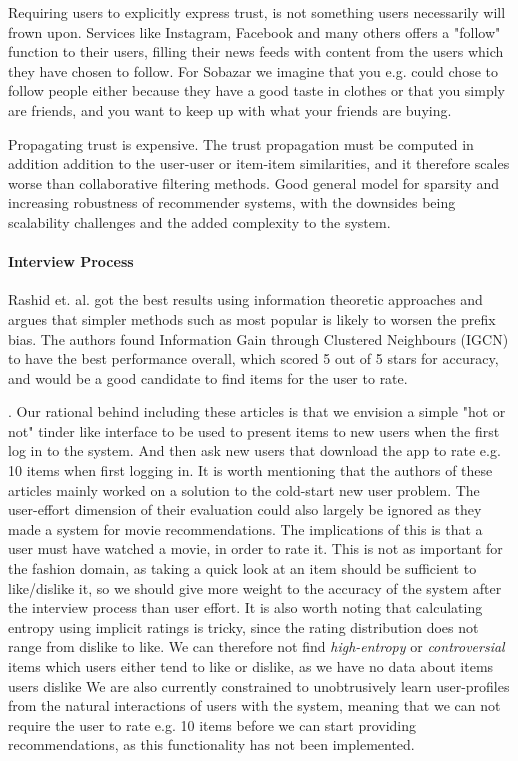 Requiring users to explicitly express trust, is not something users necessarily
will frown upon. Services like Instagram, Facebook and many others offers a
"follow" function to their users, filling their news feeds with content from
the users which they have chosen to follow. For Sobazar we imagine that you
e.g. could chose to follow people either because they have a good taste in
clothes or that you simply are friends, and you want to keep up with what your
friends are buying.

Propagating trust is expensive. The trust propagation must be computed in
addition addition to the user-user or item-item similarities, and it therefore
scales worse than collaborative filtering methods. Good general model for
sparsity and increasing robustness of recommender systems, with the downsides
being scalability challenges and the added complexity to the system.

\paragraph{Interview Process}

Rashid et. al. \cite{Rashid2008} got the best results using information
theoretic approaches and argues that simpler methods such as most popular is
likely to worsen the prefix bias. The authors found Information Gain through
Clustered Neighbours (IGCN) to have the best performance overall, which scored
5 out of 5 stars for accuracy, and would be a good candidate to find items for
the user to rate.

.
Our rational behind including these articles is that we envision a simple "hot
or not" tinder like interface to be used to present items to new users when the
first log in to the system. And then ask new users that download the app to
rate e.g. 10 items when first logging in. It is worth mentioning that the
authors of these articles mainly worked on a solution to the cold-start new
user problem. The user-effort dimension of their evaluation could also largely
be ignored as they made a system for movie recommendations. The implications of
this is that a user must have watched a movie, in order to rate it. This is not
as important for the fashion domain, as taking a quick look at an item should
be sufficient to like/dislike it, so we should give more weight to the accuracy
of the system after the interview process than user effort. It is also worth
noting that calculating entropy using implicit ratings is tricky, since the
rating distribution does not range from dislike to like. We can therefore not
find \emph{high-entropy} or \emph{controversial} items which users either tend
to like or dislike, as we have no data about items users dislike 
We are also currently constrained to unobtrusively learn user-profiles from the
natural interactions of users with the system, meaning that we can not require
the user to rate e.g. 10 items before we can start providing recommendations,
as this functionality has not been implemented.

